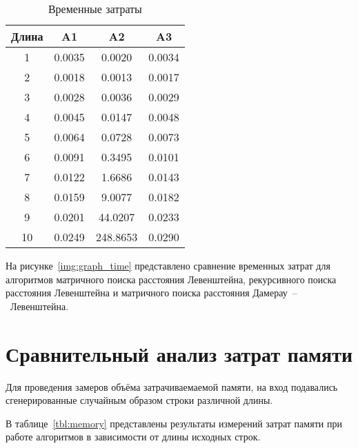 \begin{center}
    \captionsetup{justification=raggedright,singlelinecheck=off}
    \begin{longtable}[c]{|c|c|c|c|}
    \caption{Временные затраты\label{tbl:time}} \\ \hline
		Длина & A1 & A2 & A3 \\ \hline
		1 & 0.0035 & 0.0020 & 0.0034 \\\hline
		2 & 0.0018 & 0.0013 & 0.0017 \\\hline
		3 & 0.0028 & 0.0036 & 0.0029 \\\hline
		4 & 0.0045 & 0.0147 & 0.0048 \\\hline
		5 & 0.0064 & 0.0728 & 0.0073 \\\hline
		6 & 0.0091 & 0.3495 & 0.0101 \\\hline
		7 & 0.0122 & 1.6686 & 0.0143 \\\hline
		8 & 0.0159 & 9.0077 & 0.0182 \\\hline
		9 & 0.0201 & 44.0207 & 0.0233 \\\hline
		10 & 0.0249 & 248.8653 & 0.0290 \\\hline
	\end{longtable}
\end{center}

На рисунке~\ref{img:graph_time} представлено сравнение временных затрат для алгоритмов матричного поиска расстояния Левенштейна, рекурсивного поиска расстояния Левенштейна и матричного поиска расстояния Дамерау~--~Левенштейна.



\section{Сравнительный анализ затрат памяти}
Для проведения замеров объёма затрачиваемаемой памяти, на вход подавались сгенерированные случайным образом строки различной длины.

В таблице~\ref{tbl:memory} представлены результаты измерений затрат памяти при работе алгоритмов в зависимости от длины исходных строк. 

